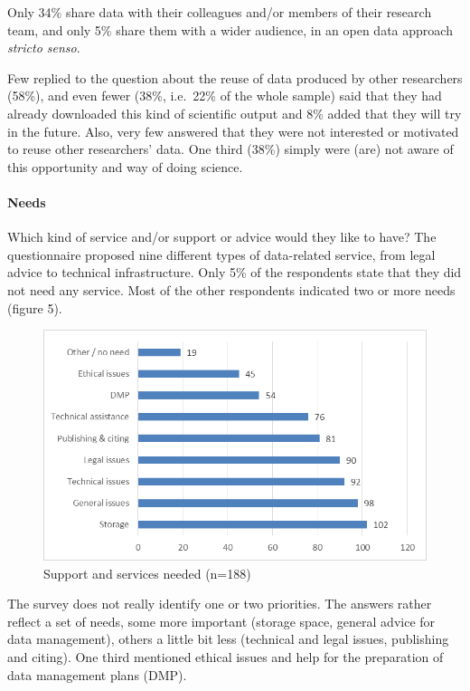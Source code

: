 \documentclass[a4paper,
fontsize=11pt,
oneside,
numbers=noperiodatend,
parskip=half-,
bibliography=totoc,
final
]{scrartcl}
\begin{document}
Only 34\% share data with their colleagues and/or members of their
research team, and only 5\% share them with a wider audience, in an open
data approach \emph{stricto senso}.

Few replied to the question about the reuse of data produced by other
researchers (58\%), and even fewer (38\%, i.e.~22\% of the whole sample)
said that they had already downloaded this kind of scientific output and
8\% added that they will try in the future. Also, very few answered that
they were not interested or motivated to reuse other researchers' data.
One third (38\%) simply were (are) not aware of this opportunity and way
of doing science.

\paragraph{Needs}\label{needs}

Which kind of service and/or support or advice would they like to have?
The questionnaire proposed nine different types of data-related service,
from legal advice to technical infrastructure. Only 5\% of the
respondents state that they did not need any service. Most of the other
respondents indicated two or more needs (figure 5).

\begin{figure}[htbp]
\centering
\includegraphics{figures/media/image5.png}
\caption{Support and services needed (n=188)}
\end{figure}

The survey does not really identify one or two priorities. The answers
rather reflect a set of needs, some more important (storage space,
general advice for data management), others a little bit less (technical
and legal issues, publishing and citing). One third mentioned ethical
issues and help for the preparation of data management plans (DMP).
\end{document}
